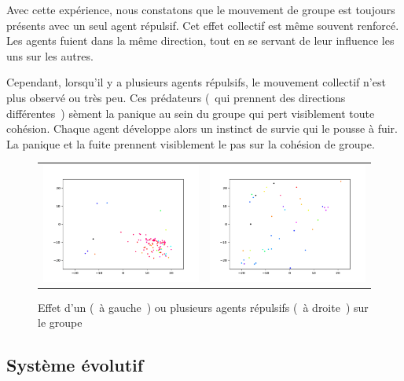 \documentclass[french, a4paper, 12pt, openany]{report}
\begin{document}
       Avec cette expérience, nous constatons que le mouvement de groupe est toujours présents avec un seul agent répulsif. Cet effet collectif est même souvent renforcé. Les agents fuient dans la même direction, tout en se servant de leur influence les uns sur les autres.
       
        Cependant, lorsqu'il y a plusieurs agents répulsifs, le mouvement collectif n'est plus observé ou très peu. Ces prédateurs (~qui prennent des directions différentes~)  sèment la panique au sein du groupe qui pert visiblement toute cohésion. Chaque agent développe alors un instinct de survie qui le pousse à fuir. La panique et la fuite prennent visiblement le pas sur la cohésion de groupe.
       
     \begin{figure}[!h]
		\centering
		\begin{tabular}{cc}
			\includegraphics[width=8cm]{images/image_17.png} & \includegraphics[width=8cm]{images/image_16.png} \\
		\end{tabular}
		\caption{Effet d'un (~à gauche~) ou plusieurs agents répulsifs (~à droite~) sur le groupe}
	\end{figure}
       
       
   
   \newpage
	\subsection{Système évolutif}
	
\end{document}
